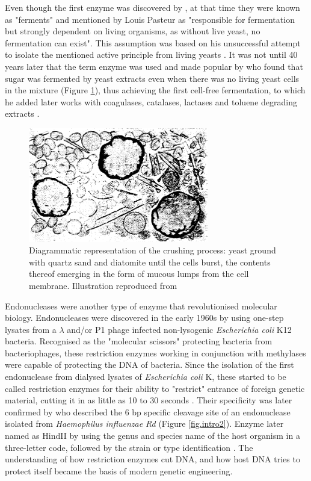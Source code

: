 Even though the first enzyme was discovered by \citet{payen1833memoir}, at that time they were known as "ferments" and mentioned by Louis Pasteur as "responsible for fermentation but strongly dependent on living organisms, as without  live  yeast,  no  fermentation  can exist". This assumption was based on his unsuccessful attempt to isolate the mentioned active principle from living yeasts \citep{manchester1995louis}. It was not until 40 years later that the term enzyme was used \citep{kuhne1877behavior} and made popular by \citet{buchner1897alkoholische} who found that sugar was fermented by yeast extracts even when there was no living yeast cells in the mixture (Figure \ref{fig.intro1}), thus achieving the first cell-free fermentation, to which he added later works with coagulases, catalases, lactases and toluene degrading extracts \citep{buchner1907cell}. 

\begin{figure}[htb]
  \centering
  \includegraphics[width=0.7\textwidth]{introduction/chapter/figs/cells_extract.png}
  \caption{Diagrammatic representation of the crushing process: yeast ground with quartz sand and diatomite until the cells burst, the contents thereof emerging in the form of mucous lumps from the cell membrane. Illustration reproduced from \citet{buchner1907cell}}
  \label{fig.intro1}
\end{figure}


Endonucleases were another type of enzyme that revolutionised molecular biology. Endonucleases were discovered in the early 1960s \citep{arber1962host} by using one-step lysates from a $\lambda$ and/or P1 phage infected non-lysogenic \textit{Escherichia coli} K12 bacteria. Recognised as the "molecular scissors" protecting bacteria from bacteriophages, these restriction enzymes working in conjunction with methylases were capable of protecting the DNA of bacteria. Since the isolation of the first endonuclease from dialysed lysates of \textit{Escherichia coli} K, these started to be called restriction enzymes for their ability to "restrict" entrance of foreign genetic material, cutting it in as little as 10 to 30 seconds \citep{meselson1968dna}. Their specificity was later confirmed by \citet{kelly1970restriction} who described the 6 bp specific cleavage site of an endonuclease isolated from \textit{Haemophilus influenzae Rd} (Figure \ref{fig.intro2}). Enzyme later named as HindII by using the genus and species name of the host organism in a three-letter code, followed by the strain or type identification \citep{smith1973suggested}. The understanding of how restriction enzymes cut DNA, and how host DNA tries to protect itself became the basis of modern genetic engineering. 

